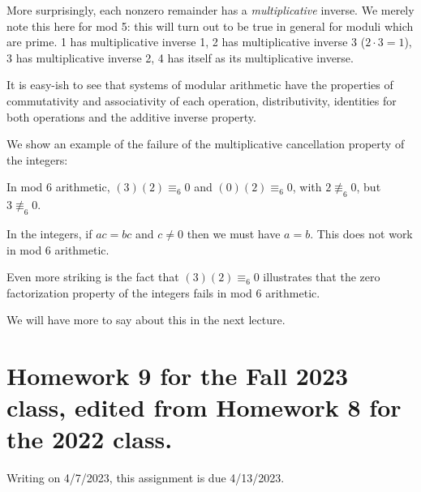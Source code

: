 \documentclass[12pt]{article}
\begin{document}
More surprisingly, each nonzero remainder has a {\em multiplicative\/} inverse.  We merely note this here for mod 5:  this will turn out to be true in general for moduli which are prime.  1 has multiplicative inverse 1, 2 has multiplicative inverse 3 ($2\cdot 3 = 1$), 3 has multiplicative inverse 2, 4 has itself as its multiplicative inverse.

It is easy-ish to see that systems of modular arithmetic have the properties of commutativity and associativity of each operation, distributivity, identities for both operations and the additive inverse property.

We show an example of the failure of the multiplicative cancellation property of the integers:

In mod 6 arithmetic, $(3)(2) \equiv_6 0$ and $(0)(2) \equiv_6 0$, with $2 \not\equiv_6 0$, but $3 \not\equiv_6 0$.

In the integers, if $ac= bc$ and $c \neq 0$ then we must have $a=b$.  This does not work in mod 6 arithmetic.

Even more striking is the fact that $(3)(2) \equiv_6 0$ illustrates that the zero factorization property of the integers fails in mod 6 arithmetic.

We will have more to say about this in the next lecture.

\section{Homework 9 for the Fall 2023 class, edited from Homework 8 for the 2022 class.}

Writing on 4/7/2023, this assignment is due 4/13/2023.
\end{document}
